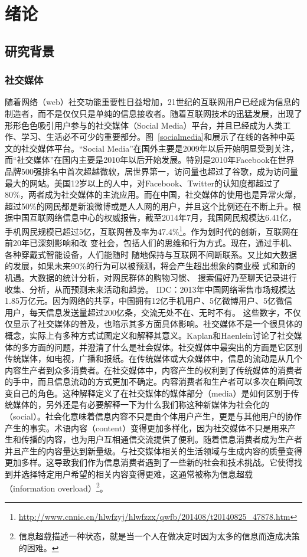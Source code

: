 \chapter{绪论}
\label{Intro}

\section{研究背景}

\subsection{社交媒体}
随着网络（web）社交功能重要性日益增加，21世纪的互联网用户已经成为信息的制造者，而不是仅仅只是单纯的信息接收者。随着互联网技术的迅猛发展，出现了形形色色吸引用户参与的社交媒体（Social Media）平台，并且已经成为人类工作、学习、生活必不可少的重要部分。图~\ref{socialmedia}和展示了在线的各种中英文的社交媒体平台。“Social Media”在国外主要是2009年以后开始明显受到关注，而“社交媒体”在国内主要是2010年以后开始发展。特别是2010年Facebook在世界品牌500强排名中首次超越微软，居世界第一，访问量也超过了谷歌，成为访问量最大的网站。美国12岁以上的人中，对Facebook、Twitter的认知度都超过了80\%，两者成为社交媒体的主流应用。而在中国，社交媒体的使用也是异常火爆，超过50\%的网民都是新浪微博或是人人网的用户，并且这个比例还在不断上升。根据中国互联网络信息中心的权威报告，截至2014年7月，我国网民规模达6.41亿，手机网民规模已超过5亿，互联网普及率为47.4\%\footnote{\url{http://www.cnnic.cn/hlwfzyj/hlwfzzx/qwfb/201408/t20140825_47878.htm}}。作为划时代的创新，互联网在前20年已深刻影响和改
变社会，包括人们的思维和行为方式。现在，通过手机、各种穿戴式智能设备，人们能随时 随地保持与互联网不间断联系。又比如大数据的发展，如果未来90\%的行为可以被预测，将会产生超出想象的商业模 式和新的机遇。大数据的统计分析，对网民群体的购物习惯、 搜索偏好乃至聊天记录进行收集、分析，从而预测未来活动和趋势。
IDC：2013年中国网络零售市场规模达1.85万亿元。因为网络的共享，中国拥有12亿手机用户、5亿微博用户、5亿微信 用户，每天信息发送量超过200亿条，交流无处不在、无时不有。
这些数字，不仅仅显示了社交媒体的普及，也暗示其多方面具体影响。社交媒体不是一个很具体的概念，实际上有多种方式试图定义和解释其意义。Kaplan和Haenlein讨论了社交媒体的多方面的问题，并澄清了什么是社会媒体。社交媒体中最突出的方面是它区别传统媒体，如电视，广播和报纸。在传统媒体或大众媒体中，信息的流动是从几个内容生产者到众多消费者。在社交媒体中，内容产生的权利到了传统媒体的消费者的手中，而且信息流动的方式更加不确定。内容消费者和生产者可以多次在瞬间改变自己的角色。这种解释定义了在社交媒体的媒体部分（media）是如何区别于传统媒体的，另外还是有必要解释一下为什么我们称这种新媒体为社会化的（social）。社会化意味着信息内容不只是由个体用户产生，更是与其他用户的协作产生的事实。术语内容（content）变得更加多样化，因为社交媒体不只是用来产生和传播的内容，也为用户互相通信交流提供了便利。随着信息消费者成为生产者并且产生的内容量达到新量级。与社交媒体相关的生活领域与生成内容的质量变得更加多样。这导致我们作为信息消费者遇到了一些新的社会和技术挑战。它使得找到并选择特定用户希望的相关内容变得更难，这通常被称为信息超载（information overload）\footnote{信息超载描述一种状态，就是当一个人在做决定时因为太多的信息而造成决策的困难。}。
